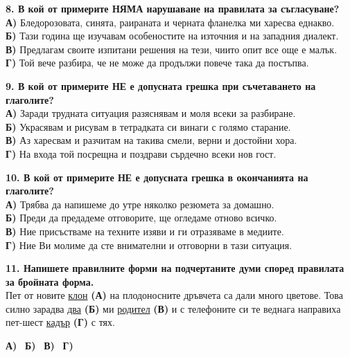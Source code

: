 \documentclass[12pt,a4paper]{article}
\begin{document}
\vspace{0.6cm}

\noindent
\textbf{8. В кой от примерите НЯМА нарушаване на правилата за съгласуване?} \\
\textbf{А)} Бледорозовата, синята, раираната и черната фланелка ми харесва еднакво. \\
\textbf{Б)} Тази година ще изучавам особеностите на източния и на западния диалект. \\
\textbf{В)} Предлагам своите изпитани решения на тези, чиито опит все още е малък. \\
\textbf{Г)} Той вече разбира, че не може да продължи повече така да постъпва.  

\vspace{0.6cm}  

\noindent
\textbf{9. В кой от примерите НЕ е допусната грешка при съчетаването на глаголите?} \\
\textbf{А)} Заради трудната ситуация разяснявам и моля всеки за разбиране. \\
\textbf{Б)} Украсявам и рисувам в тетрадката си винаги с голямо старание. \\
\textbf{В)} Аз харесвам и разчитам на такива смели, верни и достойни хора. \\
\textbf{Г)} На входа той посрещна и поздрави сърдечно всеки нов гост.

\vspace{0.6cm}

\noindent
\textbf{10. В кой от примерите НЕ е допусната грешка в окончанията на глаголите?} \\
\textbf{А)} Трябва да напишеме до утре няколко резюмета за домашно. \\
\textbf{Б)} Преди да предадеме отговорите, ще огледаме отново всичко. \\
\textbf{В)} Ние присъстваме на техните изяви и ги отразяваме в медиите. \\
\textbf{Г)} Ние Ви молиме да сте внимателни и отговорни в тази ситуация.

\vspace{0.6cm}

\noindent
\textbf{11. Напишете правилните форми на подчертаните думи според правилата за бройната форма.} \\
Пет от новите \underline{клон} \textbf{(А)} на плодоносните дръвчета са дали много цветове. Това силно зарадва \underline{два} \textbf{(Б)} ми \underline{родител} \textbf{(В)} и с телефоните си те веднага направиха пет-шест \underline{кадър} \textbf{(Г)} с тях.
\begin{flushleft}
\textbf{А)} \dotfill \
\textbf{Б)} \dotfill \
\textbf{В)} \dotfill \
\textbf{Г)} \dotfill
\end{flushleft}
\end{document}
